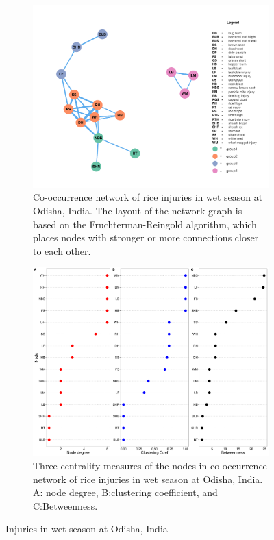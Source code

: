\begin{figure}
    \centering
    \begin{subfigure}[b]{1\textwidth}
        \includegraphics[width = 1\textwidth]{figures/networkOR_ws/networkOR_ws.pdf}
        \caption{Co-occurrence network of rice injuries in wet season at Odisha, India. The layout of the network graph is based on the Fruchterman-Reingold algorithm, which places nodes with stronger or more connections closer to each other.}
        \label{fig:networkOR_ws}
    \end{subfigure}
    \begin{subfigure}[b]{1\textwidth}
        \includegraphics[width = 1\textwidth]{figures/nodepropOR_ws/nodepropOR_ws.pdf}
        \caption{Three centrality measures of the nodes in co-occurrence network of rice injuries in wet season at Odisha, India. A: node degree, B:clustering coefficient, and C:Betweenness.}
        \label{fig:nodepropOR_ws}
    \end{subfigure}
    \caption{Injuries in wet season at Odisha, India}
    \label{fig:OD_ws}
\end{figure}


